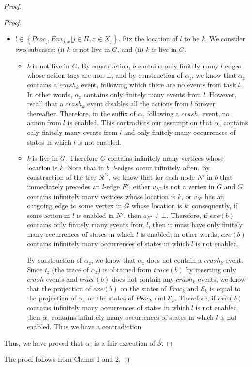 \documentclass[11pt]{article}
\numberwithin{theorem}{section}
\newcommand{\set}[1]{\left\{#1\right\}}
\begin{document}
\begin{proof}
\begin{proof}
\begin{itemize}
\item  $l \in \set{Proc_j, Env_{j,x} | j \in \Pi, x \in X_j}$. Fix the location of $l$ to be $k$. We consider two subcases: (i) $k$ is not live in $G$, and (ii) $k$ is live in $G$.
  \begin{itemize}
  \item $k$ is not live in $G$. By construction, $b$ contains only finitely many $l$-edges whose action tags are non-$\bot$, and by construction of $\alpha_z$, we know that $\alpha_z$ contains a $crash_k$ event, following which there are no events from task $l$. In other words, $\alpha_z$ contains only finitely many events from $l$. However, recall that a $crash_k$ event disables all the actions from $l$ forever thereafter. Therefore, in the suffix of $\alpha_z$ following a $crash_i$ event, no action from $l$ is enabled. This contradicts our assumption that    $\alpha_z$ contains only finitely many events from $l$ and only finitely many occurrences of states in which $l$ is not enabled.
  
  \item $k$ is live in $G$. Therefore $G$ contains infinitely many vertices whose location is $k$. Note that in $b$, $l$-edges occur infinitely often. By construction of the tree $\mathcal{R}^G$, we know that for each node $N'$ in $b$ that immediately precedes an $l$-edge $E'$, either $v_{N'}$ is not a vertex in $G$ and $G$ contains infinitely many vertices whose location is $k$, or $v_{N'}$ has an outgoing edge to some vertex in $G$ whose location is $k$; consequently, if some action in $l$ is enabled in $N'$, then $a_{E'} \neq \bot$. Therefore, if $exe(b)$ contains only finitely many events from $l$, then it must have only finitely many occurrences of states in which $l$ is enabled; in other words, $exe(b)$ contains infinitely many occurrences of states in which $l$ is not enabled. 
  
  By construction of $\alpha_z$, we know that $\alpha_z$ does not contain a $crash_k$ event. Since $t_z$ (the trace of $\alpha_z$) is obtained from $trace(b)$ by inserting only $crash$ events and $trace(b)$ does not contain any $crash_k$ events, we know that the projection of $exe(b)$ on the states of $Proc_k$ and $\mathcal{E}_k$ is equal to the projection of $\alpha_z$ on the states of $Proc_k$ and $\mathcal{E}_k$. Therefore, if $exe(b)$ contains infinitely many occurrences of states in which $l$ is not enabled, then $\alpha_z$ contains infinitely many occurrences of states in which $l$ is not enabled. Thus we have a contradiction.
  \end{itemize}
\end{itemize} 
Thus, we have proved that $\alpha_z$ is a fair execution of $\mathcal{S}$.
\end{proof}

The proof follows from Claims 1 and 2.
\end{proof}
\end{document}
